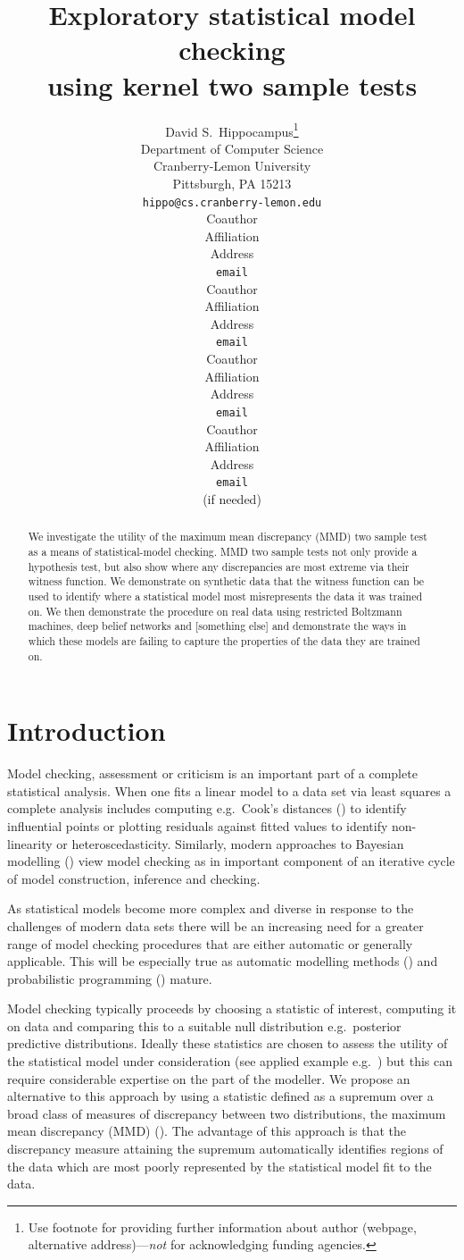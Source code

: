 \documentclass{article} %
\title{Exploratory statistical model checking\\using kernel two sample tests}
\author{
David S.~Hippocampus\thanks{ Use footnote for providing further information
about author (webpage, alternative address)---\emph{not} for acknowledging
funding agencies.} \\
Department of Computer Science\\
Cranberry-Lemon University\\
Pittsburgh, PA 15213 \\
\texttt{hippo@cs.cranberry-lemon.edu} \\
\And
Coauthor \\
Affiliation \\
Address \\
\texttt{email} \\
\AND
Coauthor \\
Affiliation \\
Address \\
\texttt{email} \\
\And
Coauthor \\
Affiliation \\
Address \\
\texttt{email} \\
\And
Coauthor \\
Affiliation \\
Address \\
\texttt{email} \\
(if needed)\\
}
\def\eg{e.g.\ }
\begin{document}
 

\maketitle

\begin{abstract} 
We investigate the utility of the maximum mean discrepancy (MMD) two sample test as a means of statistical-model checking.
MMD two sample tests not only provide a hypothesis test, but also show where any discrepancies are most extreme via their witness function.
We demonstrate on synthetic data that the witness function can be used to identify where a statistical model most misrepresents the data it was trained on.
We then demonstrate the procedure on real data using restricted Boltzmann machines, deep belief networks and [something else] and demonstrate the ways in which these models are failing to capture the properties of the data they are trained on.
\end{abstract} 

\allowdisplaybreaks

\section{Introduction}

Model checking, assessment or criticism is an important part of a complete statistical analysis.
When one fits a linear model to a data set via least squares a complete analysis includes computing \eg Cook's distances () to identify influential points or plotting residuals against fitted values to identify non-linearity or heteroscedasticity.
Similarly, modern approaches to Bayesian modelling () view model checking as in important component of an iterative cycle of model construction, inference and checking.

As statistical models become more complex and diverse in response to the challenges of modern data sets there will be an increasing need for a greater range of model checking procedures that are either automatic or generally applicable.
This will be especially true as automatic modelling methods () and probabilistic programming () mature.

Model checking typically proceeds by choosing a statistic of interest, computing it on data and comparing this to a suitable null distribution \eg posterior predictive distributions.
Ideally these statistics are chosen to assess the utility of the statistical model under consideration (see applied example \eg {}) but this can require considerable expertise on the part of the modeller.
We propose an alternative to this approach by using a statistic defined as a supremum over a broad class of measures of discrepancy between two distributions, the maximum mean discrepancy (MMD)  ().
The advantage of this approach is that the discrepancy measure attaining the supremum automatically identifies regions of the data which are most poorly represented by the statistical model fit to the data.
\end{document}
